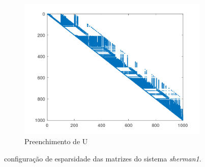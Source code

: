 \documentclass{article}
\begin{document}
\begin{figure}[H]
\begin{subfigure}[b]{0.3\textwidth}
         \centering
         \includegraphics[width=\textwidth]{image/sherman1spyU.png}
         \caption{Preenchimento de U}
         \label{fig:sherman1-spyU}
    \end{subfigure}
    \hfill
    \caption{configuração de esparsidade das matrizes do sistema \textit{sherman1}.}
    \label{fig:sherman1}
\end{figure}
\end{document}
